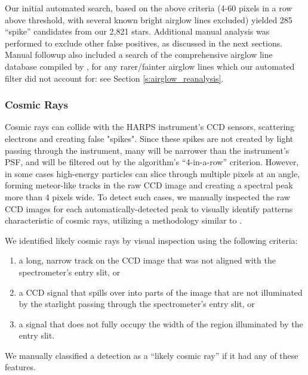 \documentclass[linenumbers]{aastex631}
\begin{document}
Our initial automated search, based on the above criteria (4-60 pixels in a row above threshold, with several known bright airglow lines excluded) yielded 285 ``spike'' candidates from our 2,821 stars. Additional manual analysis was performed to exclude other false positives, as discussed in the next sections. Manual followup also included a search of the comprehensive airglow line database compiled by \cite{UVES_database}, for any rarer/fainter airglow lines which our automated filter did not account for: see Section \ref{s:airglow_reanalysis}. 

\subsubsection{Cosmic Rays}
\label{s:cosmic}
Cosmic rays can collide with the HARPS instrument's CCD sensors, scattering electrons and creating false "spikes". Since these spikes are not created by light passing through the instrument, many will be narrower than the instrument's PSF, and will be filtered out by the algorithm's ``4-in-a-row'' criterion.  However, in some cases high-energy particles can slice through multiple pixels at an angle, forming meteor-like tracks in the raw CCD image and creating a spectral peak more than 4 pixels wide.  To detect such cases, we manually inspected the raw CCD images for each automatically-detected peak to visually identify patterns characteristic of cosmic rays, utilizing a methodology similar to \cite{Tellis_2017}. 

We identified likely cosmic rays by visual inspection using the following criteria:
\begin{enumerate}
    \item a long, narrow track on the CCD image that was not aligned with the spectrometer's entry slit, or
    \item a CCD signal that spills over into parts of the image that are not illuminated by the starlight passing through the spectrometer's entry slit, or
    \item a signal that does not fully occupy the width of the region illuminated by the entry slit.
\end{enumerate}
We manually classified a detection as a ``likely cosmic ray'' if it had any of these features.
\end{document}
